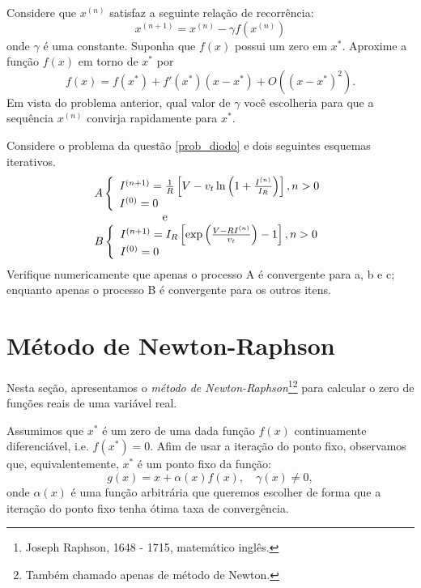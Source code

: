 \begin{Exercise}[title=Aceleração de convergência - introdução ao método de Newton]\label{int_new2} Considere que $x^{(n)}$ satisfaz a seguinte relação de recorrência:
$$x^{(n+1)}=x^{(n)} - \gamma f(x^{(n)})$$
onde $\gamma$ é uma constante. Suponha que $f(x)$ possui um zero em $x^*$. Aproxime a função $f(x)$ em torno de $x^*$ por
$$f(x)=f(x^*)+f'(x^*)(x-x^*)+O\left((x-x^*)^2\right).$$
Em vista do problema anterior, qual valor de $\gamma$ você escolheria para que a sequência $x^{(n)}$ convirja rapidamente para $x^*$. 
\end{Exercise}

\begin{Exercise} Considere o problema da questão \ref{prob_diodo} e dois seguintes esquemas iterativos.
$$\begin{array}{l}
A\left\{
\begin{array}{ll}
I^{(n+1)}=\frac{1}{R}\left[V-v_t\ln\left(1+\frac{I^{(n)}}{I_R}\right)\right],n>0\\
I^{(0)}=0
\end{array}\right.\\ \hspace{2cm} \hbox{ e }\\
B\left\{
\begin{array}{ll}
I^{(n+1)}=I_R\left[\exp\left(\frac{V-RI^{(n)}}{v_t}\right)-1\right],n>0\\
I^{(0)}=0
\end{array}\right.
\end{array}
$$
Verifique numericamente que apenas o processo A é convergente para a, b e c; enquanto apenas o processo B é convergente para os outros itens.
\end{Exercise}

\section{Método de Newton-Raphson}

Nesta seção, apresentamos o \emph{método de Newton-Raphson}\footnote{Joseph Raphson, 1648 - 1715, matemático inglês.}\footnote{Também chamado apenas de método de Newton.} para calcular o zero de funções reais de uma variável real. 

Assumimos que $x^*$ é um zero de uma dada função $f(x)$ continuamente diferenciável, i.e. $f(x^*) = 0$. Afim de usar a iteração do ponto fixo, observamos que, equivalentemente, $x^*$ é um ponto fixo da função:
\begin{equation*}
  g(x)= x + \alpha(x)f(x),\quad\gamma(x)\neq 0,
\end{equation*}
onde $\alpha(x)$ é uma função arbitrária que queremos escolher de forma que a iteração do ponto fixo tenha ótima taxa de convergência. 

